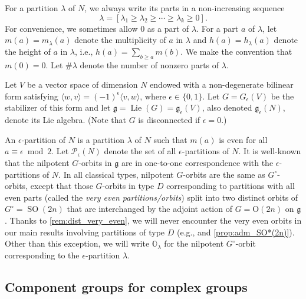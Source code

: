 \documentclass[11pt, a4paper]{amsart}
\newcommand{\g}{\mathfrak{g}}
\newcommand{\orb}{\mathbb{O}}
\newcommand{\cP}{\mathcal{P}}
\DeclareMathOperator{\Lie}{Lie}
\newcommand{\SO}{\operatorname{SO}}
\newcommand{\Pe}{\cP_\epsilon}
\theoremstyle{definition}
\numberwithin{equation}{section}
\begin{document}
For a partition $\lambda$ of $N$, we always write its parts in a non-increasing sequence 
	\[ \lambda = [\lambda_1 \geqslant \lambda_2 \geqslant \cdots \geqslant \lambda_k \geqslant 0]. \]
For convenience, we sometimes allow $0$ as a part of $\lambda$.
For a part $a$ of $\lambda$, let $m(a) = m_\lambda(a)$ denote the multiplicity of $a$ in $\lambda$ and $h(a) = h_\lambda(a)$ denote the height of $a$ in $\lambda$, i.e., $h(a)=\sum_{b\geqslant a} m(b)$. We make the convention that $m(0) = 0$. Let $\#\lambda$ denote the number of nonzero parts of $\lambda$.

Let $V$ be a vector space of dimension $N$ endowed with a non-degenerate bilinear form satisfying $\langle w,v\rangle = (-1)^\epsilon \langle v,w\rangle$, where $\epsilon\in \{ 0,1\}$.
Let $G = G_\epsilon(V)$ be the stabilizer of this form and let $\g=\Lie(G)=\g_\epsilon(V)$, also denoted $\g_\epsilon(N)$, denote its Lie algebra.
(Note that $G$ is disconnected if $\epsilon=0$.)

An $\epsilon$-partition of $N$ is a partition $\lambda$ of $N$ such that $m(a)$ is even for all $a\equiv \epsilon\bmod 2$. Let $\Pe(N)$ denote the set of all $\epsilon$-partitions of $N$.
It is well-known that the nilpotent $G$-orbits in $\g$ are in one-to-one correspondence with the $\epsilon$-partitions of $N$. In all classical types, nilpotent $G$-orbits are the same as $G^\circ$-orbits, except that those $G$-orbits in type $D$ corresponding to partitions with all even parts (called the \emph{very even partitions/orbits}) split into two distinct orbits of $G^\circ = \SO(2n)$ that are interchanged by the adjoint action of $G=\mathrm{O}(2n)$ on $\g$. Thanks to \cref{rem:dist_very_even}, we will never encounter the very even orbits in our main results involving partitions of type $D$ (e.g.,  and \cref{prop:adm_SO*(2n)}). Other than this exception, we will write $\orb_\lambda$ for the nilpotent $G^\circ$-orbit corresponding to the $\epsilon$-partition $\lambda$.

\subsection{Component groups for complex groups} \label{subsec:component_groups}
\end{document}
